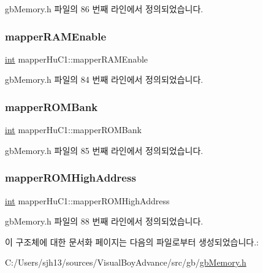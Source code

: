 gb\+Memory.\+h 파일의 86 번째 라인에서 정의되었습니다.

\mbox{\label{structmapper_hu_c1_abed6ba52cc80f9c0571ecc9a4673c253}} 
\subsubsection{\texorpdfstring{mapper\+R\+A\+M\+Enable}{mapperRAMEnable}}
{\footnotesize\ttfamily \mbox{\hyperlink{_util_8cpp_a0ef32aa8672df19503a49fab2d0c8071}{int}} mapper\+Hu\+C1\+::mapper\+R\+A\+M\+Enable}



gb\+Memory.\+h 파일의 84 번째 라인에서 정의되었습니다.

\mbox{\label{structmapper_hu_c1_a7fb083af2e79a98adbcc83ff4d039c6e}} 
\subsubsection{\texorpdfstring{mapper\+R\+O\+M\+Bank}{mapperROMBank}}
{\footnotesize\ttfamily \mbox{\hyperlink{_util_8cpp_a0ef32aa8672df19503a49fab2d0c8071}{int}} mapper\+Hu\+C1\+::mapper\+R\+O\+M\+Bank}



gb\+Memory.\+h 파일의 85 번째 라인에서 정의되었습니다.

\mbox{\label{structmapper_hu_c1_a016a39f55f5441bdaed916ff0477e0c6}} 
\subsubsection{\texorpdfstring{mapper\+R\+O\+M\+High\+Address}{mapperROMHighAddress}}
{\footnotesize\ttfamily \mbox{\hyperlink{_util_8cpp_a0ef32aa8672df19503a49fab2d0c8071}{int}} mapper\+Hu\+C1\+::mapper\+R\+O\+M\+High\+Address}



gb\+Memory.\+h 파일의 88 번째 라인에서 정의되었습니다.



이 구조체에 대한 문서화 페이지는 다음의 파일로부터 생성되었습니다.\+:\begin{DoxyCompactItemize}
\item 
C\+:/\+Users/sjh13/sources/\+Visual\+Boy\+Advance/src/gb/\mbox{\hyperlink{gb_memory_8h}{gb\+Memory.\+h}}\end{DoxyCompactItemize}
